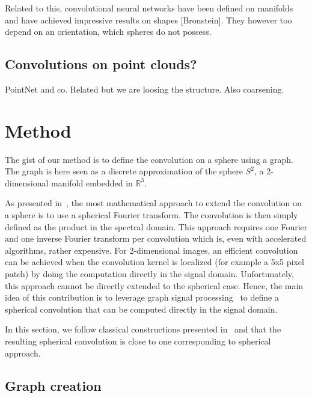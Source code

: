 \documentclass[preprint,12pt,authoryear]{elsarticle}
\newcommand{\nati}[1]{{\color[rgb]{.1,.6,.1}{#1}}}
\newcommand{\assign}[1]{{\color[rgb]{.8,.5,.8}{Assigned: #1 }}}
\begin{document}
Related to this, convolutional neural networks have been defined on manifolds and have achieved impressive results on shapes [Bronstein]. They however too depend on an orientation, which spheres do not possess.

\subsection{Convolutions on point clouds?}

PointNet and co. Related but we are loosing the structure. Also coarsening.

\section{Method}

The gist of our method is to define the convolution on a sphere using a graph. The graph is here seen as a discrete approximation of the sphere $S^2$, a 2-dimensional manifold embedded in $\mathbb{R}^3$.

As presented in~\cite{cohen2018spherical}, the most mathematical approach to extend the convolution on a sphere is to use a spherical Fourier transform. The convolution is then simply defined as the product in the spectral domain. This approach requires one Fourier and one inverse Fourier transform per convolution which is, even with accelerated algorithms, rather expensive. For 2-dimensional images, an efficient convolution can be achieved when the convolution kernel is localized (for example a 5x5 pixel patch) by doing the computation directly in the signal domain. Unfortunately, this approach cannot be directly extended to the spherical case. Hence, the main idea of this contribution is to leverage graph signal processing~\cite{shuman2013emerging} to define a spherical convolution that can be computed directly in the signal domain. 

In this section, we follow classical constructions presented in~\cite{cohen2018spherical,...} and \nati{show} that the resulting spherical convolution is close to one corresponding to spherical approach.

\subsection{Graph creation}
\assign{Nathanaël}
\end{document}
